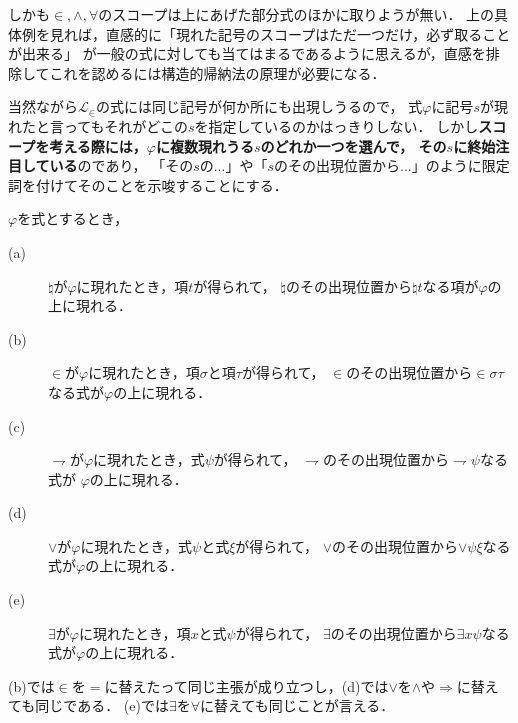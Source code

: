 	しかも$\in,\wedge,\forall$のスコープは上にあげた部分式のほかに取りようが無い．
	上の具体例を見れば，直感的に「現れた記号のスコープはただ一つだけ，必ず取ることが出来る」
	が一般の式に対しても当てはまるであるように思えるが，直感を排除してこれを認めるには構造的帰納法の原理が必要になる．
	
	当然ながら$\mathcal{L}_{\in}$の式には同じ記号が何か所にも出現しうるので，
	式$\varphi$に記号$s$が現れたと言ってもそれがどこの$s$を指定しているのかはっきりしない．
	しかし{\bf スコープを考える際には，$\varphi$に複数現れうる$s$のどれか一つを選んで，
	その$s$に終始注目している}のであり，
	「その$s$の...」や「$s$のその出現位置から...」のように限定詞を付けてそのことを示唆することにする．
	
	\begin{screen}
		\begin{metathm}[スコープの存在]\label{metathm:existence_of_scopes_L_in}
		$\varphi$を式とするとき，
		\begin{description}
			\item[(a)] $\natural$が$\varphi$に現れたとき，項$t$が得られて，
				$\natural$のその出現位置から$\natural t$なる項が$\varphi$の上に現れる．
				
			\item[(b)] $\in$が$\varphi$に現れたとき，項$\sigma$と項$\tau$が得られて，
				$\in$のその出現位置から$\in \sigma \tau$なる式が$\varphi$の上に現れる．
				
			\item[(c)] $\rightharpoondown$が$\varphi$に現れたとき，式$\psi$が得られて，
				$\rightharpoondown$のその出現位置から$\rightharpoondown \psi$なる式が
				$\varphi$の上に現れる．
				
			\item[(d)] $\vee$が$\varphi$に現れたとき，式$\psi$と式$\xi$が得られて，
				$\vee$のその出現位置から$\vee \psi \xi$なる式が$\varphi$の上に現れる．
				
			\item[(e)] $\exists$が$\varphi$に現れたとき，項$x$と式$\psi$が得られて，
				$\exists$のその出現位置から$\exists x \psi$なる式が$\varphi$の上に現れる．
		\end{description}
		\end{metathm}
	\end{screen}
	
	(b)では$\in$を$=$に替えたって同じ主張が成り立つし，(d)では$\vee$を$\wedge$や$\Longrightarrow$に替えても同じである．
	(e)では$\exists$を$\forall$に替えても同じことが言える．
	
